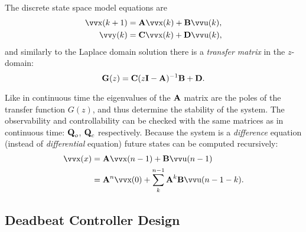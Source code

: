 The discrete state space model equations are
\begin{align*}
	\vec{x}(k + 1) &= \mx{A} \vec{x}(k) + \mx{B} \vec{u}(k), \\
	\vec{y}(k) &= \mx{C} \vec{x}(k) + \mx{D} \vec{u}(k),
\end{align*}
and similarly to the Laplace domain solution there is a \emph{transfer matrix} in the \(z\)-domain:
\[
	\bm{\mathrm{G}}(z) = \bm{\mathrm{C}} (z\bm{\mathrm{I}} - \bm{\mathrm{A}})^{-1} \bm{\mathrm{B}} + \bm{\mathrm{D}}.
\]

Like in continuous time the eigenvalues of the \(\bm{\mathrm{A}}\) matrix are the poles of the transfer function \(G(z)\), and thus determine the stability of the system. The observability and controllability can be checked with the same matrices as in continuous time: \(\bm{\mathrm{Q}}_o\), \(\bm{\mathrm{Q}}_c\) respectively. Because the system is a \emph{difference} equation (instead of \emph{differential} equation) future states can be computed recursively:
\begin{align*}
	\vec{x}(x) &= \mx{A} \vec{x}(n-1) + \mx{B} \vec{u} (n-1) \\
		&= \mx{A}^n \vec{x}(0) + \sum_k^{n-1} \mx{A}^k \mx{B} \vec{u}(n - 1 - k).
\end{align*}

\subsection{Deadbeat Controller Design}
